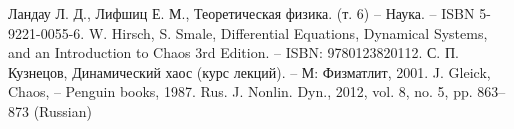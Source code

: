 \begin{thebibliography}{2}
Ландау Л. Д., Лифшиц Е. М., Теоретическая физика. (т. 6) -- Наука. -- ISBN 5-9221-0055-6.
W. Hirsch, S. Smale, Differential Equations, Dynamical Systems, and an Introduction to Chaos
3rd Edition. -- ISBN: 9780123820112.
С. П. Кузнецов, Динамический хаос (курс лекций). -- М: Физматлит, 2001.
J. Gleick, Chaos, -- Penguin books, 1987.
Rus. J. Nonlin. Dyn., 2012, vol. 8, no. 5, pp. 863–873 (Russian)
\end{thebibliography}
